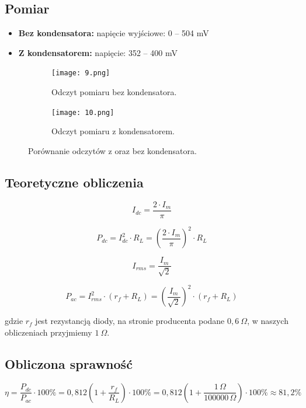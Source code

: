 \documentclass[a4paper,12pt]{article}
\begin{document}
\subsection*{Pomiar}

\begin{itemize}
    \item \textbf{Bez kondensatora:} napięcie wyjściowe: 0 -- 504 mV
    \item \textbf{Z kondensatorem:} napięcie: 352 -- 400 mV
\end{itemize}
\begin{figure}[H]
    \centering
    \begin{subfigure}{0.45\textwidth}
        \centering
        \texttt{[image: 9.png]}
        \caption{Odczyt pomiaru bez kondensatora.}
        \label{fig:schemat1}
    \end{subfigure}
    \hfill
    \begin{subfigure}{0.45\textwidth}
        \centering
        \texttt{[image: 10.png]}
        \caption{Odczyt pomiaru z kondensatorem.}
        \label{fig:schemat2}
    \end{subfigure}
    \caption{Porównanie odczytów z oraz bez kondensatora.}
    \label{fig:porownanie}
\end{figure}

\subsection*{Teoretyczne obliczenia}

\[
I_{dc} = \frac{2 \cdot I_m}{\pi}
\]

\[
P_{dc} = I_{dc}^2 \cdot R_L = \left( \frac{2 \cdot I_m}{\pi} \right)^2 \cdot R_L
\]

\[
I_{rms} = \frac{I_m}{\sqrt{2}}
\]

\[
P_{ac} = I_{rms}^2 \cdot (r_f + R_L) = \left( \frac{I_m}{\sqrt{2}} \right)^2 \cdot (r_f + R_L)
\]

gdzie $r_f$ jest rezystancją diody, na stronie producenta podane $0{,}6\ \Omega$, w naszych obliczeniach przyjmiemy $1\ \Omega$.

\subsection*{Obliczona sprawność}
\[
\eta = \frac{P_{dc}}{P_{ac}} \cdot 100\% = 0{,}812 \left( 1 + \frac{r_f}{R_L} \right) \cdot 100\% = 0{,}812 \left( 1 + \frac{1\,\Omega}{100000\,\Omega} \right) \cdot 100\% \approx 81{,}2\%
\]
\end{document}
